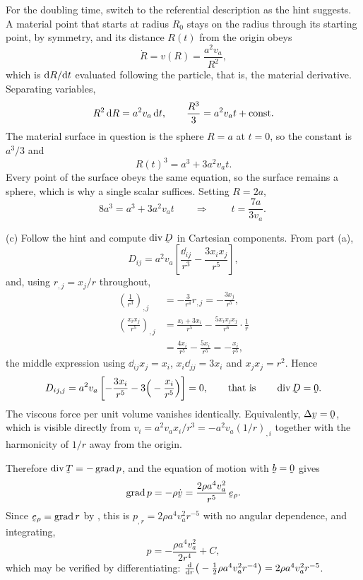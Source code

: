 \begin{solution}
For the doubling time, switch to the referential description as the hint
suggests. A material point that starts at radius $R_{0}$ stays on the
radius through its starting point, by symmetry, and its distance $R(t)$
from the origin obeys
\[
   \dot R=v(R)=\frac{a^{2}v_{a}}{R^{2}} ,
\]
which is $\mathrm{d} R/\mathrm{d} t$ evaluated following the particle, that is, the
material derivative. Separating variables,
\[
   R^{2}\,\mathrm{d} R=a^{2}v_{a}\,\mathrm{d} t,
   \qquad
   \frac{R^{3}}{3}=a^{2}v_{a}t+\text{const}.
\]
The material surface in question is the sphere $R=a$ at $t=0$, so the
constant is $a^{3}/3$ and
\[
   R(t)^{3}=a^{3}+3a^{2}v_{a}t .
\]
Every point of the surface obeys the same equation, so the surface
remains a sphere, which is why a single scalar suffices. Setting
$R=2a$,
\[
   8a^{3}=a^{3}+3a^{2}v_{a}t
   \qquad\Longrightarrow\qquad
   \boxed{\ t=\frac{7a}{3v_{a}} . \ }
\]

(c) Follow the hint and compute $\dvg\bD$ in Cartesian components. From
part (a),
\[
   D_{ij}=a^{2}v_{a}\left[\frac{\dd_{ij}}{r^{3}}
   -\frac{3x_{i}x_{j}}{r^{5}}\right],
\]
and, using $r_{,j}=x_{j}/r$ throughout,
\[
\begin{aligned}
   \left(\frac{1}{r^{3}}\right)_{,j}&=-\frac{3}{r^{4}}r_{,j}
   =-\frac{3x_{j}}{r^{5}},\\
   \left(\frac{x_{i}x_{j}}{r^{5}}\right)_{,j}
   &=\frac{x_{i}+3x_{i}}{r^{5}}
   -\frac{5x_{i}x_{j}x_{j}}{r^{6}}\cdot\frac1r\\
   &=\frac{4x_{i}}{r^{5}}-\frac{5x_{i}}{r^{5}}
   =-\frac{x_{i}}{r^{5}},
\end{aligned}
\]
the middle expression using $\dd_{ij}x_{j}=x_{i}$, $x_{i}\dd_{jj}
=3x_{i}$ and $x_{j}x_{j}=r^{2}$. Hence
\[
   D_{ij,j}=a^{2}v_{a}\left[-\frac{3x_{i}}{r^{5}}
   -3\Big(-\frac{x_{i}}{r^{5}}\Big)\right]=0 ,
   \qquad\text{that is}\qquad
   \dvg\bD=\bze .
\]
The viscous force per unit volume vanishes identically. Equivalently,
$\Delta\bv=\bze$, which is visible directly from
$v_{i}=a^{2}v_{a}x_{i}/r^{3}=-a^{2}v_{a}(1/r)_{,i}$ together with the
harmonicity of $1/r$ away from the origin.

Therefore $\dvg\bT=-\grad p$, and the equation of motion 
with $\bb=\bze$ gives
\[
   \grad p=-\rho\dot\bv=\frac{2\rho a^{4}v_{a}^{2}}{r^{5}}\,\berho .
\]
Since $\berho=\grad r$ by , this is $p_{,r}=2\rho
a^{4}v_{a}^{2}r^{-5}$ with no angular dependence, and integrating,
\[
   p=-\frac{\rho a^{4}v_{a}^{2}}{2r^{4}}+C ,
\]
which may be verified by differentiating: $\frac{\mathrm{d}}{\mathrm{d} r}
\big(-\tfrac12\rho a^{4}v_{a}^{2}r^{-4}\big)
=2\rho a^{4}v_{a}^{2}r^{-5}$.


\end{solution}
